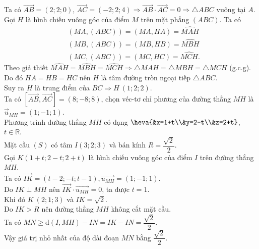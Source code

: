 \begin{ex}
{\begin{center}
\end{center}	
Ta có $\overrightarrow{A B}=(2 ; 2 ; 0)$, $\overrightarrow{A C}=(-2 ; 2 ; 4) \Rightarrow \overrightarrow{A B} \cdot \overrightarrow{A C}=0 \Rightarrow \triangle ABC$ vuông tại $A$.\\
Gọi $H$ là hình chiếu vuông góc của điểm $M$ trên mặt phẳng $(A B C)$. Ta có
$$
\begin{aligned}
	& (MA, (ABC))=(MA, HA)=\widehat{MAH} \\
	& (MB, (ABC))=(MB, HB)=\widehat{MBH} \\
	& (MC, (ABC))=(MC, HC)=\widehat{MCH}.
\end{aligned}
$$
 Theo giả thiết $\widehat{MAH}=\widehat{MBH}=\widehat{MCH} \Rightarrow \triangle MAH=\triangle MBH=\triangle MCH$ (g.c.g).\\
Do đó $HA=HB=HC$ nên $H$ là tâm đường tròn ngoại tiếp $\triangle ABC$.\\
Suy ra $H$ là trung điểm của $BC\Rightarrow H\ (1; 2; 2)$.\\
Ta có $[\overrightarrow{AB}, \overrightarrow{AC}]=(8;-8; 8)$, chọn véc-tơ  chỉ phương của đường thẳng $MH$ là $\overrightarrow{u}_{MH}=(1;-1; 1)$. \\
Phương trình đường thẳng $MH$ có dạng $\heva{&x=1+t\\&y=2-t\\&z=2+t}$, $t\in \mathbb{R}$.\\
	Mặt cầu $(S)$ có tâm $I(3 ; 2 ; 3)$ và bán kính $R=\dfrac{\sqrt{2}}{2}$.\\
 Gọi $K(1+t; 2-t; 2+t)$ là hình chiếu vuông góc của điểm $I$ trên đường thẳng $MH$.\\
Ta có $\overrightarrow{IK}=(t-2;-t; t-1), \overrightarrow{u_{MH}}=(1;-1; 1)$.\\
Do $IK\perp MH$ nên $\overrightarrow{IK} \cdot \overrightarrow{u_{MH}}=0$, ta được $t=1$.\\
Khi đó $K\ (2; 1; 3)$ và $IK=\sqrt{2}$.\\
Do $IK > R$ nên đường thẳng $MH$ không cắt mặt cầu.\\
Ta có $MN\geq \mathrm{d}(I, MH)-IN=IK-IN=\dfrac{\sqrt{2}}{2}$.\\
Vậy giá trị nhỏ nhất của độ dài đoạn $M N$ bằng $\dfrac{\sqrt{2}}{2}$.
	}
\end{ex}